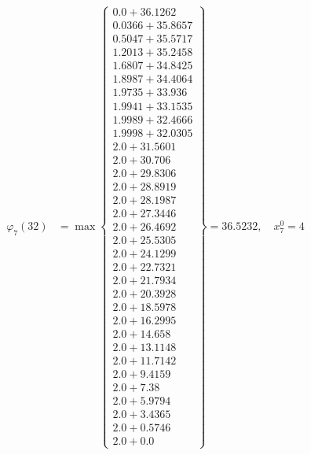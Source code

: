 \documentclass{article}
\begin{document}
\begin{align*}
\varphi_{7}(32) &= \max \left\{ \begin{array}{c}
0.0 + 36.1262 \\
 0.0366 + 35.8657 \\
 0.5047 + 35.5717 \\
 1.2013 + 35.2458 \\
 1.6807 + 34.8425 \\
 1.8987 + 34.4064 \\
 1.9735 + 33.936 \\
 1.9941 + 33.1535 \\
 1.9989 + 32.4666 \\
 1.9998 + 32.0305 \\
 2.0 + 31.5601 \\
 2.0 + 30.706 \\
 2.0 + 29.8306 \\
 2.0 + 28.8919 \\
 2.0 + 28.1987 \\
 2.0 + 27.3446 \\
 2.0 + 26.4692 \\
 2.0 + 25.5305 \\
 2.0 + 24.1299 \\
 2.0 + 22.7321 \\
 2.0 + 21.7934 \\
 2.0 + 20.3928 \\
 2.0 + 18.5978 \\
 2.0 + 16.2995 \\
 2.0 + 14.658 \\
 2.0 + 13.1148 \\
 2.0 + 11.7142 \\
 2.0 + 9.4159 \\
 2.0 + 7.38 \\
 2.0 + 5.9794 \\
 2.0 + 3.4365 \\
 2.0 + 0.5746 \\
 2.0 + 0.0
\end{array} \right\}=36.5232, \quad x_{7}^0=4\\
  

\end{align*}
\end{document}

